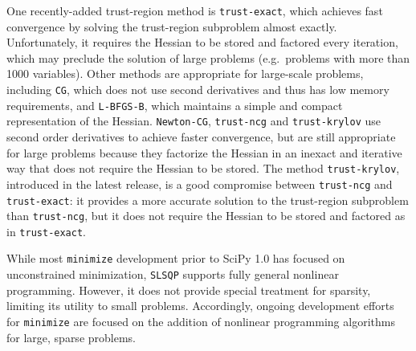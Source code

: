 One recently-added trust-region method is \texttt{trust-exact},
which achieves fast convergence by solving the trust-region subproblem almost exactly.
Unfortunately, it requires the Hessian to be stored and factored every iteration, which may preclude
the solution of large problems (e.g.~problems with more than 1000 variables).
Other methods are appropriate for large-scale problems, including
\texttt{CG}, which does not use second derivatives and thus has low memory requirements, and \texttt{L-BFGS-B}, which maintains a simple and compact representation of the Hessian.
\texttt{Newton-CG}, \texttt{trust-ncg} and \texttt{trust-krylov} use second order derivatives to achieve faster
convergence, but are still appropriate for large problems because they factorize the Hessian in an inexact and iterative way that does not require the Hessian to be stored.
The method \texttt{trust-krylov}, introduced in the latest release, is a good compromise between
\texttt{trust-ncg} and \texttt{trust-exact}: it provides a more accurate solution to the trust-region
subproblem than \texttt{trust-ncg}, but it does not require the Hessian to be stored and factored as in \texttt{trust-exact}.

While most \texttt{minimize} development prior to SciPy 1.0 has focused on unconstrained minimization, 
\texttt{SLSQP} supports fully general nonlinear programming. However, it does not provide special treatment for sparsity, limiting its utility to small problems. Accordingly, ongoing development efforts for \texttt{minimize} are focused on the addition of nonlinear programming algorithms for large, sparse problems. 

